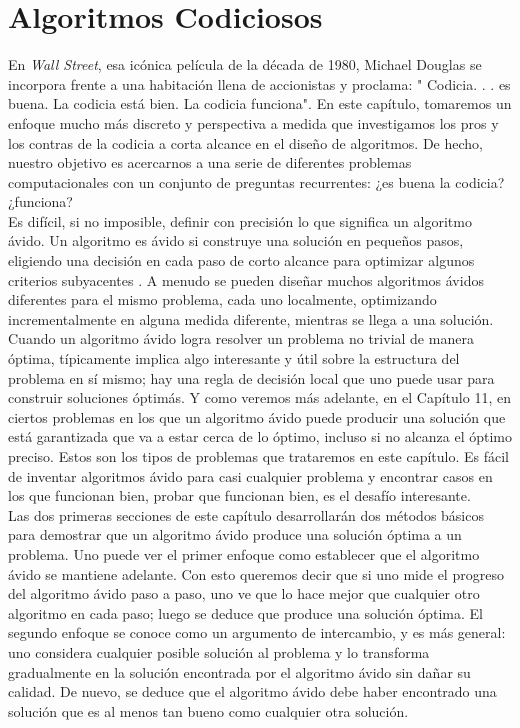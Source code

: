 \documentclass[a4paper, 12pt]{book}
\theoremstyle{dotless}
\begin{document}
\newpage

\chapter{Algoritmos Codiciosos}

En \textit{Wall Street}, esa icónica película de la década de 1980, Michael Douglas se incorpora frente a una habitación llena de accionistas y proclama: " Codicia. . . es buena. La codicia está bien. La codicia funciona". En este capítulo, tomaremos un enfoque mucho más discreto y perspectiva a medida que investigamos los pros y los contras de la codicia a corta alcance en el diseño de algoritmos. De hecho, nuestro objetivo es acercarnos a una serie de diferentes problemas computacionales con un conjunto de preguntas recurrentes: ¿es buena la codicia? ¿funciona?\\

Es difícil, si no imposible, definir con precisión lo que significa un algoritmo ávido. Un algoritmo es ávido si construye una solución en pequeños pasos, eligiendo una decisión en cada paso de corto alcance para optimizar algunos criterios subyacentes . A menudo se pueden diseñar muchos algoritmos ávidos diferentes para el mismo problema, cada uno localmente, optimizando incrementalmente en alguna medida diferente, mientras se llega a una solución.\\

Cuando un algoritmo ávido logra resolver un problema no trivial de manera óptima, típicamente implica algo interesante y útil sobre la estructura del problema en sí mismo; hay una regla de decisión local que uno puede usar para construir soluciones óptimás. Y como veremos más adelante, en el Capítulo 11, en ciertos problemas en los que un algoritmo ávido puede producir una solución que está garantizada que va a estar cerca de lo óptimo, incluso si no alcanza el óptimo preciso. Estos son los tipos de problemas que trataremos en este capítulo. Es fácil de inventar algoritmos ávido para casi cualquier problema y encontrar casos en los que funcionan bien, probar que funcionan bien, es el desafío interesante.\\

Las dos primeras secciones de este capítulo desarrollarán dos métodos básicos para demostrar que un algoritmo ávido produce una solución óptima a un problema. Uno puede ver el primer enfoque como establecer que el algoritmo ávido se mantiene adelante. Con esto queremos decir que si uno mide el progreso del algoritmo ávido paso a paso, uno ve que lo hace mejor que cualquier otro algoritmo en cada paso; luego se deduce que produce una solución óptima. El segundo enfoque se conoce como un argumento de intercambio, y es más general: uno considera cualquier posible solución al problema y lo transforma gradualmente en la solución encontrada por el algoritmo ávido sin dañar su calidad. De nuevo, se deduce que el algoritmo ávido debe haber encontrado una solución que es al menos tan bueno como cualquier otra solución.\\
\end{document}
